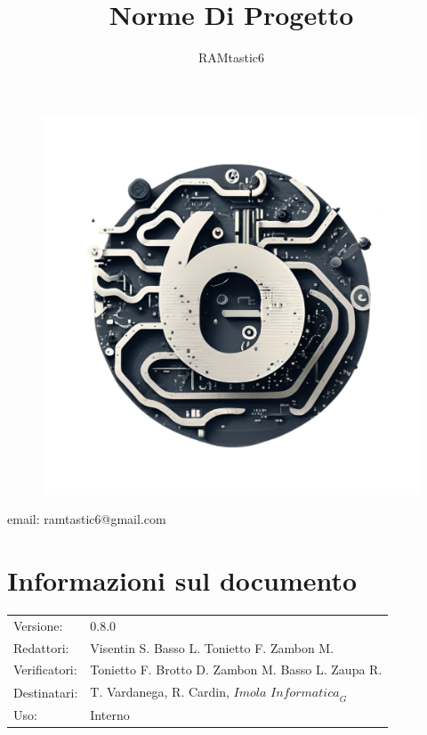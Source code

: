 \documentclass[12pt, oneside]{article}
\author{RAMtastic6}
\begin{document}
\thispagestyle{empty}
\title{Norme Di Progetto}
\maketitle
\begin{figure}[h]
  \centering
  \includegraphics[scale=0.3]{logo.png}
\end{figure}
\begin{center}
    email: ramtastic6@gmail.com
\end{center}

\section*{Informazioni sul documento}
\begin{tabular}{ll}
Versione: & 0.8.0 \\
Redattori: &  Visentin S. Basso L. Tonietto F. Zambon M. \\
Verificatori: & Tonietto F. Brotto D. Zambon M. Basso L. Zaupa R. \\
Destinatari: & T. Vardanega, R. Cardin, $\textit{Imola Informatica}_G$ \\
Uso: & Interno
\end{tabular}
\newpage
\end{document}
